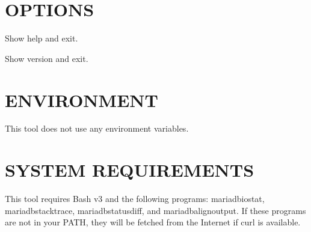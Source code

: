 \documentclass[letterpaper,10pt,english]{sphinxmanual}
\begin{document}
\section{OPTIONS}
\label{\detokenize{mariadb-stat-browser:options}}

\begin{fulllineitems}
\label{\detokenize{mariadb-stat-browser:cmdoption-mariadb-stat-browser-help}}
Show help and exit.

\end{fulllineitems}


\begin{fulllineitems}
\label{\detokenize{mariadb-stat-browser:cmdoption-mariadb-stat-browser-version}}
Show version and exit.

\end{fulllineitems}



\section{ENVIRONMENT}
\label{\detokenize{mariadb-stat-browser:environment}}
This tool does not use any environment variables.


\section{SYSTEM REQUIREMENTS}
\label{\detokenize{mariadb-stat-browser:system-requirements}}
This tool requires Bash v3 and the following programs: mariadb\sphinxhyphen{}iostat, mariadb\sphinxhyphen{}stacktrace,
mariadb\sphinxhyphen{}status\sphinxhyphen{}diff, and mariadb\sphinxhyphen{}align\sphinxhyphen{}output.  If these programs are not in your PATH,
they will be fetched from the Internet if curl is available.
\end{document}
